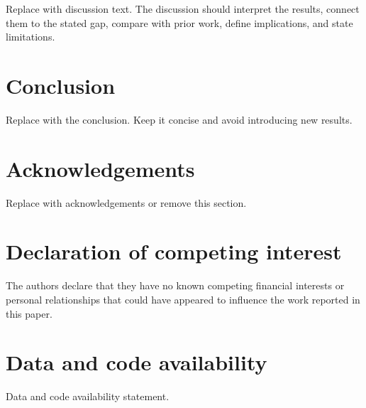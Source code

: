 \documentclass[12pt]{article}
\begin{document}
Replace with discussion text. The discussion should interpret the results,
connect them to the stated gap, compare with prior work, define implications,
and state limitations.

\section{Conclusion}\label{conclusion}

Replace with the conclusion. Keep it concise and avoid introducing new
results.

\section*{Acknowledgements}

Replace with acknowledgements or remove this section.

\section*{Declaration of competing interest}

The authors declare that they have no known competing financial interests or
personal relationships that could have appeared to influence the work reported
in this paper.

\section*{Data and code availability}

Data and code availability statement.



\end{document}

